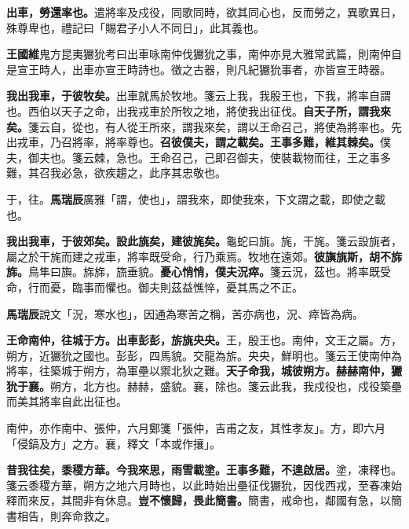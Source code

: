 
\textbf{出車，勞還率也。}{\footnotesize 遣將率及戍役，同歌同時，欲其同心也，反而勞之，異歌異日，殊尊卑也，禮記曰「賜君子小人不同日」，此其義也。}

\begin{quoting}\textbf{王國維}鬼方昆夷玁狁考曰出車咏南仲伐玁狁之事，南仲亦見大雅常武篇，則南仲自是宣王時人，出車亦宣王時詩也。徵之古器，則凡紀玁狁事者，亦皆宣王時器。\end{quoting}

\textbf{我出我車，于彼牧矣。}{\footnotesize 出車就馬於牧地。箋云上我，我殷王也，下我，將率自謂也。西伯以天子之命，出我戎車於所牧之地，將使我出征伐。}\textbf{自天子所，謂我來矣。}{\footnotesize 箋云自，從也，有人從王所來，謂我來矣，謂以王命召己，將使為將率也。先出戎車，乃召將率，將率尊也。}\textbf{召彼僕夫，謂之載矣。王事多難，維其棘矣。}{\footnotesize 僕夫，御夫也。箋云棘，急也。王命召己，己即召御夫，使裝載物而往，王之事多難，其召我必急，欲疾趨之，此序其忠敬也。}

\begin{quoting}于，往。\textbf{馬瑞辰}廣雅「謂，使也」，謂我來，即使我來，下文謂之載，即使之載也。\end{quoting}

\textbf{我出我車，于彼郊矣。設此旐矣，建彼旄矣。}{\footnotesize 龜蛇曰旐。旄，干旄。箋云設旐者，屬之於干旄而建之戎車，將率既受命，行乃乘焉。牧地在遠郊。}\textbf{彼旟旐斯，胡不旆旆。}{\footnotesize 鳥隼曰旟。旆旆，旒垂貌。}\textbf{憂心悄悄，僕夫況瘁。}{\footnotesize 箋云況，茲也。將率既受命，行而憂，臨事而懼也。御夫則茲益憔悴，憂其馬之不正。}

\begin{quoting}\textbf{馬瑞辰}說文「況，寒水也」，因通為寒苦之稱，苦亦病也，況、瘁皆為病。\end{quoting}

\textbf{王命南仲，往城于方。出車彭彭，旂旐央央。}{\footnotesize 王，殷王也。南仲，文王之屬。方，朔方，近玁狁之國也。彭彭，四馬貌。交龍為旂。央央，鮮明也。箋云王使南仲為將率，往築城于朔方，為軍壘以禦北狄之難。}\textbf{天子命我，城彼朔方。赫赫南仲，玁狁于襄。}{\footnotesize 朔方，北方也。赫赫，盛貌。襄，除也。箋云此我，我戍役也，戍役築壘而美其將率自此出征也。}

\begin{quoting}南仲，亦作南中、張仲，六月鄭箋「張仲，吉甫之友，其性孝友」。方，即六月「侵鎬及方」之方。襄，釋文「本或作攘」。\end{quoting}

\textbf{昔我往矣，黍稷方華。今我來思，雨雪載塗。王事多難，不遑啟居。}{\footnotesize 塗，凍釋也。箋云黍稷方華，朔方之地六月時也，以此時始出壘征伐玁狁，因伐西戎，至春凍始釋而來反，其間非有休息。}\textbf{豈不懷歸，畏此簡書。}{\footnotesize 簡書，戒命也，鄰國有急，以簡書相告，則奔命救之。}

